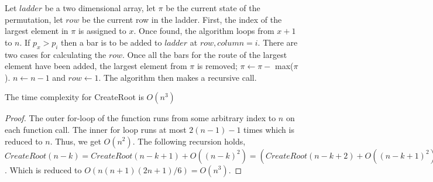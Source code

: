 Let $ladder$ be a two dimensional array, let $\pi$ be the current state of the permutation, let $row$ be the current row in the ladder. 
First, the index of the largest element in $\pi$ is assigned to $x$. 
Once found, the algorithm loops from $x+1$ to $n$. If $p_{x}>p_{i}$ then a bar is to be added to 
$ladder$ at $row,column=i$. There are two cases for calculating the $row$. 
Once all the bars for the route of the largest element have been added, the largest element from $\pi$ is removed; 
$\pi \gets \pi -$ {\sc max($\pi$)}. $n \gets n-1$ and $row \gets 1$. The algorithm then makes a recursive call.

\begin{lemma}
	The time complexity for CreateRoot is $O(n^{3})$
\end{lemma}
\begin{proof}
	The outer for-loop of the function runs from some arbitrary index to $n$ on each function call. The inner for loop runs at most 
	$2(n-1)-1$ times which is reduced to $n$. Thus, we get $O(n^{2})$. The following 
	recursion holds, $CreateRoot(n-k) = CreateRoot(n-k+1) + O((n-k)^{2})=(CreateRoot(n-k+2) + O((n-k+1)^{2})) + O((n-k)^{2})\dots $. Which is 
	reduced to $O(n(n+1)(2n+1)/6) = O(n^3)$.
\end{proof}

